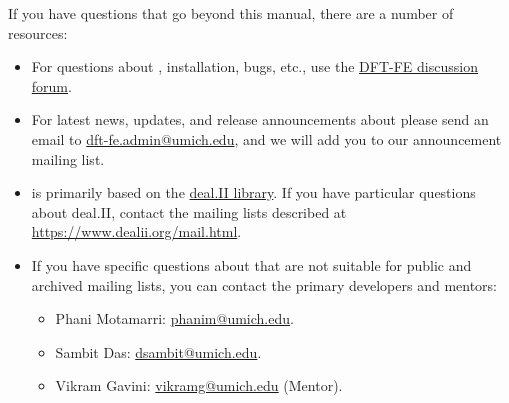 If you have questions that go beyond this manual, there are a number of
resources:
\begin{itemize}
\item For questions about \dftfe, installation, bugs, etc., use the 
	\href{https://groups.google.com/forum/#!forum/dftfe-user-group}{DFT-FE discussion forum}. 

\item For latest news, updates, and release announcements about \dftfe{} please send an email to \href{mailto:dft-fe.admin@umich.edu}{dft-fe.admin@umich.edu}, and we will add you to our announcement mailing list.		

\item \dftfe{} is primarily based on the \href{http://www.dealii.org/}{deal.II library}. If you have particular questions
  about deal.II, contact the mailing lists described at \url{https://www.dealii.org/mail.html}.

\item If you have specific questions about \dftfe{} that are not suitable
  for public and archived mailing lists, you can contact the
  primary developers and mentors:
  \begin{itemize}
  \item Phani Motamarri: \url{phanim@umich.edu}.
  \item Sambit Das: \url{dsambit@umich.edu}.
  \item Vikram Gavini: \url{vikramg@umich.edu} (Mentor).
  \end{itemize}
\end{itemize}
